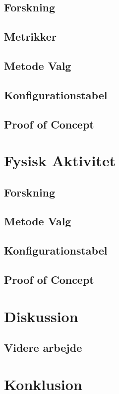 \section{Forskning}

\section{Metrikker}

\section{Metode Valg}

\section{Konfigurationstabel}
\section{Proof of Concept}


\chapter{Fysisk Aktivitet}
\section{Forskning}

\section{Metode Valg}
\section{Konfigurationstabel}
\section{Proof of Concept}

\chapter{Diskussion}
\section{Videre arbejde}

\chapter{Konklusion}


